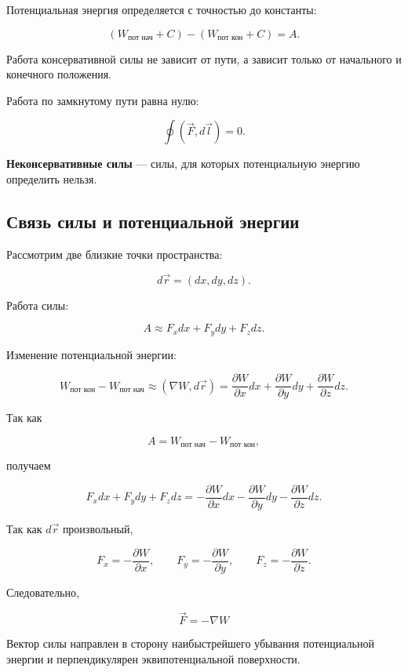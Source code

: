 \documentclass[a4paper,12pt]{article}
\begin{document}
Потенциальная энергия определяется с точностью до константы:

\[
(W_{\text{пот нач}} + C) - (W_{\text{пот кон}} + C) = A.
\]

Работа консервативной силы не зависит от пути, а зависит только от начального и конечного положения.

Работа по замкнутому пути равна нулю:

\[
\oint (\vec F, d\vec l) = 0.
\]

\begin{definitionbox}
\textbf{Неконсервативные силы} — силы, для которых потенциальную энергию определить нельзя.
\end{definitionbox}

\vspace{0.8em}

\subsection*{Связь силы и потенциальной энергии}

Рассмотрим две близкие точки пространства:

\[
d\vec r = (dx,dy,dz).
\]

Работа силы:

\[
A \approx F_x dx + F_y dy + F_z dz.
\]

Изменение потенциальной энергии:

\[
W_{\text{пот кон}} - W_{\text{пот нач}}
\approx
(\nabla W, d\vec r)
=
\frac{\partial W}{\partial x} dx
+
\frac{\partial W}{\partial y} dy
+
\frac{\partial W}{\partial z} dz.
\]

Так как

\[
A = W_{\text{пот нач}} - W_{\text{пот кон}},
\]

получаем

\[
F_x dx + F_y dy + F_z dz
=
-
\frac{\partial W}{\partial x} dx
-
\frac{\partial W}{\partial y} dy
-
\frac{\partial W}{\partial z} dz.
\]

Так как $d\vec r$ произвольный,

\[
F_x = -\frac{\partial W}{\partial x},
\qquad
F_y = -\frac{\partial W}{\partial y},
\qquad
F_z = -\frac{\partial W}{\partial z}.
\]

Следовательно,

\[
\vec F = -\nabla W
\]

Вектор силы направлен в сторону наибыстрейшего убывания потенциальной энергии и перпендикулярен эквипотенциальной поверхности.

\vspace{0.8em}
\end{document}
